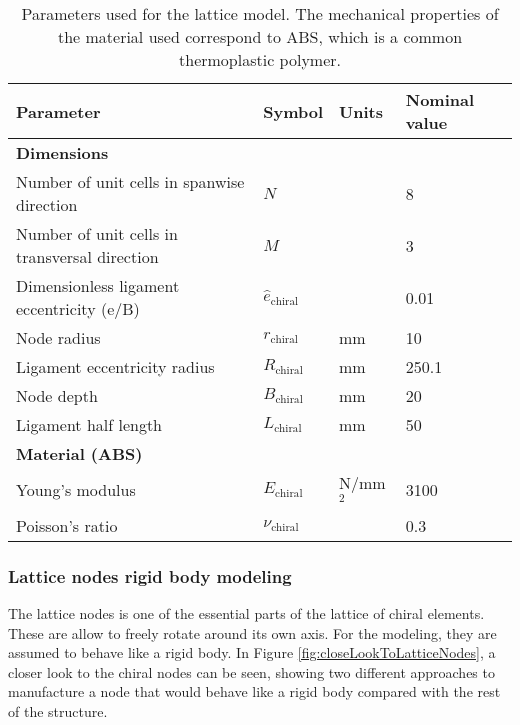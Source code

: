 \begin{table}[!htpb]
\centering
\begin{tabular}{|l|lll|}
\hline
\textbf{Parameter} & \multicolumn{1}{l|}{\textbf{Symbol}} & \multicolumn{1}{l|}{\textbf{Units}} & \textbf{Nominal value} \\ \hline \hline
{\textbf{Dimensions}} &  &  &  \\ \hline
Number of unit cells in spanwise direction & \multicolumn{1}{l|}{$N$} & \multicolumn{1}{l|}{} & 8 \\ \hline
Number of unit cells in transversal direction & \multicolumn{1}{l|}{$M$} & \multicolumn{1}{l|}{} & 3 \\ \hline
Dimensionless ligament eccentricity (e/B) & \multicolumn{1}{l|}{$\hat{e}_{\mathrm{chiral}}$} & \multicolumn{1}{l|}{} & 0.01 \\ \hline
Node radius & \multicolumn{1}{l|}{$r_{\mathrm{chiral}}$} & \multicolumn{1}{l|}{mm} & 10 \\ \hline
Ligament eccentricity radius & \multicolumn{1}{l|}{$R_{\mathrm{chiral}}$} & \multicolumn{1}{l|}{mm} & 250.1 \\ \hline
Node depth & \multicolumn{1}{l|}{$B_{\mathrm{chiral}}$} & \multicolumn{1}{l|}{mm} & 20 \\ \hline
Ligament half length & \multicolumn{1}{l|}{$L_{\mathrm{chiral}}$} & \multicolumn{1}{l|}{mm} & 50 \\ \hline \hline
{\textbf{Material (ABS)}} &  &  &  \\ \hline
Young's modulus & \multicolumn{1}{l|}{$E_{\mathrm{chiral}}$} & \multicolumn{1}{l|}{N/mm$^2$} & 3100 \\ \hline
Poisson's ratio & \multicolumn{1}{l|}{$\nu_{\mathrm{chiral}}$} & \multicolumn{1}{l|}{} & 0.3 \\ \hline
\end{tabular}
\caption[Parameters used for the lattice model]{Parameters used for the lattice model. The mechanical properties of the material used correspond to ABS, which is a common thermoplastic polymer.}
\label{tab:parameters_lattice}
\end{table}

\clearpage
\subsubsection{Lattice nodes rigid body modeling} \label{subsubsec:latticeNodesRigid_Parametrization}

The lattice nodes is one of the essential parts of the lattice of chiral elements. These are allow to freely rotate around its own axis. For the modeling, they are assumed to behave like a rigid body. In Figure \ref{fig:closeLookToLatticeNodes}, a closer look to the chiral nodes can be seen, showing two different approaches to manufacture a node that would behave like a rigid body compared with the rest of the structure.


